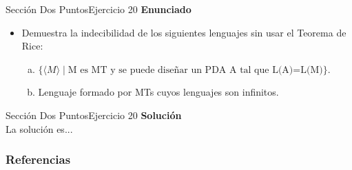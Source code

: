 \documentclass[10pt, envcountsect, presentation, aspectratio=169]{beamer}
\begin{document}
\begin{frame}{Sección Dos Puntos}{Ejercicio 20}
    \textbf{Enunciado}
    \begin{itemize}
        \item Demuestra la indecibilidad de los siguientes lenguajes sin usar el Teorema de Rice:
        \begin{enumerate}[a)]
            \item $\{\langle M \rangle \mid \mbox{M es MT y  se puede diseñar  un PDA A tal que L(A)=L(M)}\}$.
            \item Lenguaje formado por MTs  cuyos lenguajes son infinitos.
        \end{enumerate}
    \end{itemize}
\end{frame}


\begin{frame}{Sección Dos Puntos}{Ejercicio 20}
    \textbf{Solución}\\
    La solución es...
\end{frame}




\begin{frame} %
	\frametitle{Referencias}
	\footnotesize
	
		
\end{frame}    
		
\end{document}
